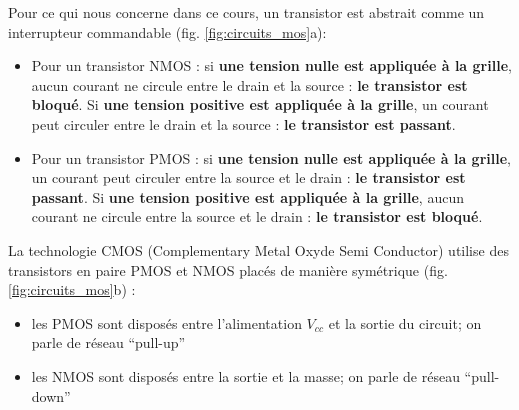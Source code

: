Pour ce qui nous concerne dans ce cours, un transistor est abstrait comme un interrupteur commandable (fig. \ref{fig:circuits_mos}a):
\begin{itemize} 
\item Pour un transistor NMOS : si \textbf{une tension nulle est appliquée à la grille}, aucun courant ne circule entre le drain et la source : \textbf{le transistor est bloqué}. Si \textbf{une tension positive est appliquée à la grille}, un courant peut circuler entre le drain et la source : \textbf{le transistor est passant}.
\item Pour un transistor PMOS : si \textbf{une tension nulle est appliquée à la grille}, un courant peut circuler entre la source et le drain : \textbf{le transistor est passant}. Si \textbf{une tension positive est appliquée à la grille}, aucun courant ne circule entre la source et le drain : \textbf{le transistor est bloqué}.
\end{itemize}
La technologie CMOS (Complementary Metal Oxyde Semi Conductor) utilise des transistors en paire PMOS et NMOS placés de manière symétrique (fig. \ref{fig:circuits_mos}b) :
\begin{itemize}
\item les PMOS sont disposés entre l'alimentation $V_{cc}$ et la sortie du circuit; on parle de réseau ``pull-up''
\item les NMOS sont disposés entre la sortie et la masse; on parle de réseau ``pull-down''
\end{itemize}

